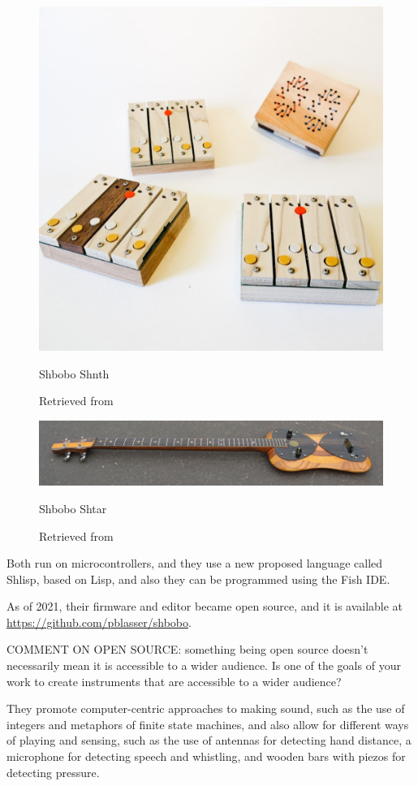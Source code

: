 \begin{figure}[ht]
  \centering
  \includegraphics[width=0.75\linewidth,height=0.25\textheight,keepaspectratio]{images/shbobo-shnth.jpg}
  \caption{Shbobo Shnth}
  \caption*{Retrieved from \cite{website-shbobo-current}}
  \label{fig:shbobo-shnth}
\end{figure}

\begin{figure}[ht]
  \centering
    \includegraphics[width=0.75\linewidth,height=0.25\textheight,keepaspectratio]{images/shbobo-shtar.jpg}
  \caption{Shbobo Shtar}
  \caption*{Retrieved from \cite{website-shbobo-current}}
  \label{fig:shbobo-shtar}
\end{figure}

Both run on microcontrollers, and they use a new proposed language called Shlisp, based on Lisp, and also they can be programmed using the Fish IDE.

As of 2021, their firmware and editor became open source, and it is available at \url{https://github.com/pblasser/shbobo}.

COMMENT ON OPEN SOURCE: something being open source doesn't necessarily mean it is accessible to a wider audience. Is one of the goals of your work to create instruments that are accessible to a wider audience?

They promote computer-centric approaches to making sound, such as the use of integers and metaphors of finite state machines, and also allow for different ways of playing and sensing, such as the use of antennas for detecting hand distance, a microphone for detecting speech and whistling, and wooden bars with piezos for detecting pressure.

